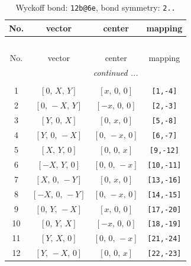 \documentclass[fleqn,8pt]{jsarticle}
\begin{document}
\begin{longtable}{cccc}
\caption{Wyckoff bond: {\tt 12b@6e}, bond symmetry: {\tt 2..}}
 \\
 \hline \hline
No. & vector & center & mapping \\ \hline \endfirsthead

\multicolumn{3}{l}{\tablename\ \thetable{}} \\
 \hline \hline
No. & vector & center & mapping \\ \hline \endhead

 \hline \hline
\multicolumn{3}{r}{\footnotesize\it continued ...} \\ \endfoot

 \hline \hline
\multicolumn{3}{r}{} \\ \endlastfoot

1 & $\left[ 0,\, X,\, Y \right]$ & $\left[ x,\, 0,\, 0 \right]$ & {\tt [1,-4]} \\ \hline
2 & $\left[ 0,\, - X,\, Y \right]$ & $\left[ - x,\, 0,\, 0 \right]$ & {\tt [2,-3]} \\ \hline
3 & $\left[ Y,\, 0,\, X \right]$ & $\left[ 0,\, x,\, 0 \right]$ & {\tt [5,-8]} \\ \hline
4 & $\left[ Y,\, 0,\, - X \right]$ & $\left[ 0,\, - x,\, 0 \right]$ & {\tt [6,-7]} \\ \hline
5 & $\left[ X,\, Y,\, 0 \right]$ & $\left[ 0,\, 0,\, x \right]$ & {\tt [9,-12]} \\ \hline
6 & $\left[ - X,\, Y,\, 0 \right]$ & $\left[ 0,\, 0,\, - x \right]$ & {\tt [10,-11]} \\ \hline
7 & $\left[ X,\, 0,\, - Y \right]$ & $\left[ 0,\, x,\, 0 \right]$ & {\tt [13,-16]} \\ \hline
8 & $\left[ - X,\, 0,\, - Y \right]$ & $\left[ 0,\, - x,\, 0 \right]$ & {\tt [14,-15]} \\ \hline
9 & $\left[ 0,\, Y,\, - X \right]$ & $\left[ x,\, 0,\, 0 \right]$ & {\tt [17,-20]} \\ \hline
10 & $\left[ 0,\, Y,\, X \right]$ & $\left[ - x,\, 0,\, 0 \right]$ & {\tt [18,-19]} \\ \hline
11 & $\left[ Y,\, X,\, 0 \right]$ & $\left[ 0,\, 0,\, - x \right]$ & {\tt [21,-24]} \\ \hline
12 & $\left[ Y,\, - X,\, 0 \right]$ & $\left[ 0,\, 0,\, x \right]$ & {\tt [22,-23]} \\
\end{longtable}
\renewcommand{\arraystretch}{1.2}
\end{document}
